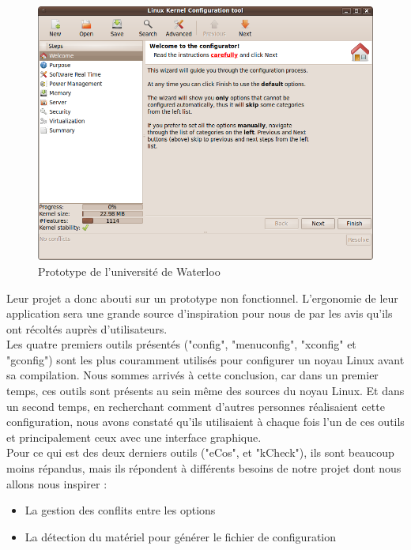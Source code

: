 \documentclass[16pts]{report}
\begin{document}
\begin{figure}[H]
    \includegraphics[scale=0.6]{illustrations/lkc_config.png}
    \centering
    \caption{Prototype de l'université de Waterloo}
    \label{fig:PrototypeWaterloo}
\end{figure}

Leur projet a donc abouti sur un prototype non fonctionnel.  L’ergonomie de
leur application sera une grande source d’inspiration pour nous de par les avis
qu’ils ont récoltés auprès d’utilisateurs.
\\

Les quatre premiers outils présentés ("config", "menuconfig", "xconfig" et
"gconfig") sont les plus couramment utilisés pour configurer un noyau Linux
avant sa compilation. Nous sommes arrivés à cette conclusion, car dans un
premier temps, ces outils sont présents au sein même des sources du noyau
Linux.  Et dans un second temps, en recherchant comment d'autres personnes
réalisaient cette configuration, nous avons constaté qu'ils utilisaient à
chaque fois l'un de ces outils et principalement ceux avec une interface
graphique.
\\

Pour ce qui est des deux derniers outils ("eCos", et "kCheck"), ils sont
beaucoup moins répandus, mais ils répondent à différents besoins de notre projet
dont nous allons nous inspirer :
\begin{itemize}
    \item La gestion des conflits entre les options
    \item La détection du matériel pour générer le fichier de configuration
\end{itemize}
\end{document}
